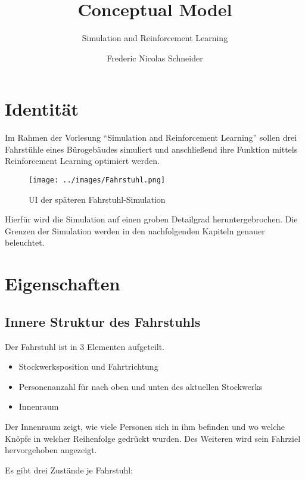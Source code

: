 \documentclass[
]{book}
\title{Conceptual Model}
\subtitle{Simulation and Reinforcement Learning}
\author{Frederic Nicolas Schneider}
\date{}
\providecommand{\tightlist}{%
  \setlength{\itemsep}{0pt}\setlength{\parskip}{0pt}}
\begin{document}
\frontmatter
\maketitle

\mainmatter
\newpage

\hypertarget{identituxe4t}{%
\chapter{Identität}\label{identituxe4t}}

Im Rahmen der Vorlesung ``Simulation and Reinforcement Learning'' sollen
drei Fahrstühle eines Bürogebäudes simuliert und anschließend ihre
Funktion mittels Reinforcement Learning optimiert werden.

\begin{figure}
\centering
\texttt{[image: ../images/Fahrstuhl.png]}
\caption{UI der späteren Fahrstuhl-Simulation}
\end{figure}

Hierfür wird die Simulation auf einen groben Detailgrad
heruntergebrochen. Die Grenzen der Simulation werden in den
nachfolgenden Kapiteln genauer beleuchtet.

\hypertarget{eigenschaften}{%
\chapter{Eigenschaften}\label{eigenschaften}}

\hypertarget{innere-struktur-des-fahrstuhls}{%
\section{Innere Struktur des
Fahrstuhls}\label{innere-struktur-des-fahrstuhls}}

Der Fahrstuhl ist in 3 Elementen aufgeteilt.

\begin{itemize}
\tightlist
\item
  Stockwerksposition und Fahrtrichtung
\item
  Personenanzahl für nach oben und unten des aktuellen Stockwerks
\item
  Innenraum
\end{itemize}

Der Innenraum zeigt, wie viele Personen sich in ihm befinden und wo
welche Knöpfe in welcher Reihenfolge gedrückt wurden. Des Weiteren wird
sein Fahrziel hervorgehoben angezeigt.

Es gibt drei Zustände je Fahrstuhl:
\end{document}
